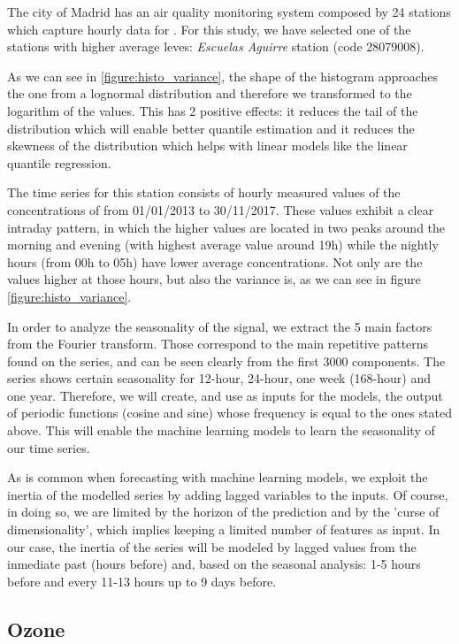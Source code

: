 \documentclass[a4paper,3p,sort&compress]{elsarticle}
\begin{document}
The city of Madrid has an air quality monitoring system composed by 24
stations which capture hourly data for \no.  For this study, we have
selected one of the stations with higher average leves: \emph{Escuelas
Aguirre} station (code 28079008).

As we can see in \ref{figure:histo_variance}, the shape of the histogram
approaches the one from a lognormal distribution and therefore we
transformed to the logarithm of the values. This has 2 positive
effects: it reduces the tail of the distribution which will enable
better quantile estimation and it reduces the skewness of the
distribution which helps with linear models like the linear quantile
regression.

The time series for this station consists of hourly measured values of
the concentrations of \no from 01/01/2013 to
30/11/2017. These values exhibit a clear intraday pattern, in which
the higher values are located in two peaks around the morning and
evening (with highest average value around 19h) while the nightly
hours (from 00h to 05h) have lower average concentrations.  Not only
are the values higher at those hours, but also the variance is, as we
can see in figure \ref{figure:histo_variance}.
 
In order to analyze the seasonality of the signal, we extract the 5
main factors from the Fourier transform. Those correspond to the main
repetitive patterns found on the series, and can be seen clearly from
the first 3000 components. The series shows certain seasonality for
12-hour, 24-hour, one week (168-hour) and one year.  Therefore, we will
create, and use as inputs for the models, the output of periodic
functions (cosine and sine) whose frequency is equal to the ones
stated above. This will enable the machine learning models to learn
the seasonality of our time series.

As is common when forecasting with machine learning models, we exploit
the inertia of the modelled series by adding lagged variables to the
inputs. Of course, in doing so, we are limited by the horizon of the
prediction and by the 'curse of dimensionality', which implies keeping
a limited number of features as input. In our case, the inertia of the
series will be modeled by lagged values from the inmediate past (hours
before) and, based on the seasonal analysis: 1-5 hours before and
every 11-13 hours up to 9 days before.

\subsection{Ozone}
\end{document}
